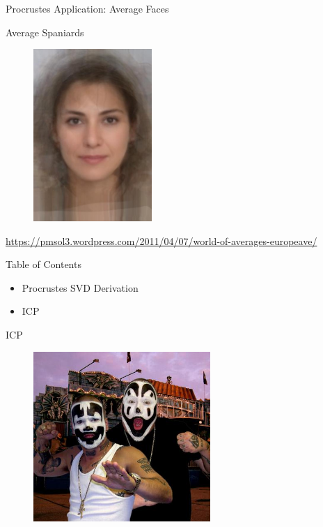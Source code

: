 \documentclass{beamer}
\begin{document}
\begin{frame}{Procrustes Application: Average Faces}

Average Spaniards

\begin{figure}[t]
\centering
    \includegraphics[width=0.4\textwidth]{averagespaniardfemale.jpg}%
\end{figure}

\tiny \url{https://pmsol3.wordpress.com/2011/04/07/world-of-averages-europeave/}

\end{frame}


\begin{frame}{Table of Contents}
\begin{itemize}[label=$\vartriangleright$]
	\item Procrustes SVD Derivation
\end{itemize}
\begin{itemize}[label=$\blacktriangleright$]
	\item ICP 
\end{itemize}
\end{frame}


\begin{frame}{ICP}


\begin{figure}[t]
	\centering
    \includegraphics[width=0.6\textwidth]{icp.png}
\end{figure}


\end{frame}
\end{document}
